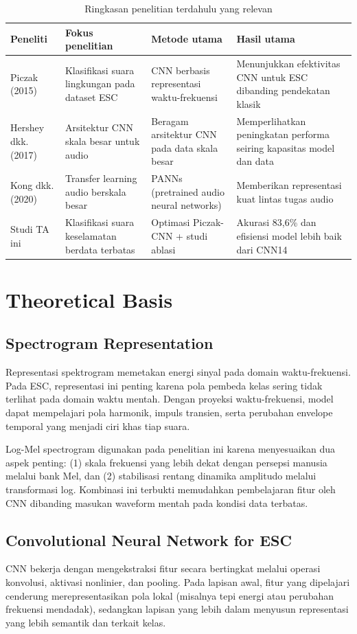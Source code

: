 \documentclass[10pt,a4paper]{jurnalvarian}
\let\LaTeXsection\section
\let\LaTeXsubsection\subsection
\def\section{\setlength{\leftskip}{0cm}\LaTeXsection}
\def\subsection{\setlength{\leftskip}{0.6cm}\LaTeXsubsection}
\begin{document}
\begin{table}[H]
\centering
\fontsize{8pt}{10pt}\selectfont
\caption{Ringkasan penelitian terdahulu yang relevan}
\begin{tabular}{p{2.1cm}p{3.3cm}p{3.4cm}p{2.3cm}}
\hline
Peneliti & Fokus penelitian & Metode utama & Hasil utama \\
\hline
Piczak (2015) & Klasifikasi suara lingkungan pada dataset ESC & CNN berbasis representasi waktu-frekuensi & Menunjukkan efektivitas CNN untuk ESC dibanding pendekatan klasik \\
Hershey dkk. (2017) & Arsitektur CNN skala besar untuk audio & Beragam arsitektur CNN pada data skala besar & Memperlihatkan peningkatan performa seiring kapasitas model dan data \\
Kong dkk. (2020) & Transfer learning audio berskala besar & PANNs (pretrained audio neural networks) & Memberikan representasi kuat lintas tugas audio \\
Studi TA ini & Klasifikasi suara keselamatan berdata terbatas & Optimasi Piczak-CNN + studi ablasi & Akurasi 83,6\% dan efisiensi model lebih baik dari CNN14 \\
\hline
\end{tabular}
\end{table}

\section{Theoretical Basis}
\subsection{Spectrogram Representation}
Representasi spektrogram memetakan energi sinyal pada domain waktu-frekuensi. Pada ESC, representasi ini penting karena pola pembeda kelas sering tidak terlihat pada domain waktu mentah. Dengan proyeksi waktu-frekuensi, model dapat mempelajari pola harmonik, impuls transien, serta perubahan envelope temporal yang menjadi ciri khas tiap suara.

Log-Mel spectrogram digunakan pada penelitian ini karena menyesuaikan dua aspek penting: (1) skala frekuensi yang lebih dekat dengan persepsi manusia melalui bank Mel, dan (2) stabilisasi rentang dinamika amplitudo melalui transformasi log. Kombinasi ini terbukti memudahkan pembelajaran fitur oleh CNN dibanding masukan waveform mentah pada kondisi data terbatas.

\subsection{Convolutional Neural Network for ESC}
CNN bekerja dengan mengekstraksi fitur secara bertingkat melalui operasi konvolusi, aktivasi nonlinier, dan pooling. Pada lapisan awal, fitur yang dipelajari cenderung merepresentasikan pola lokal (misalnya tepi energi atau perubahan frekuensi mendadak), sedangkan lapisan yang lebih dalam menyusun representasi yang lebih semantik dan terkait kelas.
\end{document}
